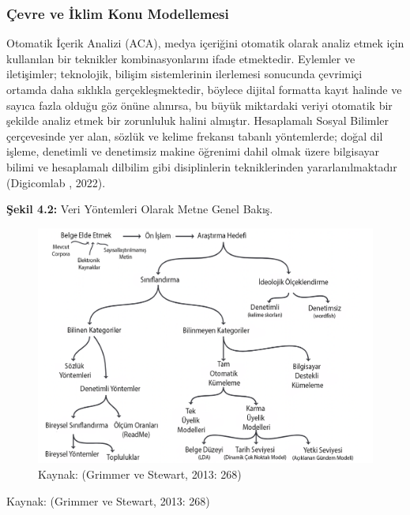\documentclass[
]{book}
\begin{document}
\hypertarget{uxe7evre-ve-iklim-konu-modellemesi}{%
\subsubsection{Çevre ve İklim Konu Modellemesi}\label{uxe7evre-ve-iklim-konu-modellemesi}}

Otomatik İçerik Analizi (ACA), medya içeriğini otomatik olarak analiz etmek için kullanılan bir teknikler kombinasyonlarını ifade etmektedir. Eylemler ve iletişimler; teknolojik, bilişim sistemlerinin ilerlemesi sonucunda çevrimiçi ortamda daha sıklıkla gerçekleşmektedir, böylece dijital formatta kayıt halinde ve sayıca fazla olduğu göz önüne alınırsa, bu büyük miktardaki veriyi otomatik bir şekilde analiz etmek bir zorunluluk halini almıştır. Hesaplamalı Sosyal Bilimler çerçevesinde yer alan, sözlük ve kelime frekansı tabanlı yöntemlerde; doğal dil işleme, denetimli ve denetimsiz makine öğrenimi dahil olmak üzere bilgisayar bilimi ve hesaplamalı dilbilim gibi disiplinlerin tekniklerinden yararlanılmaktadır (Digicomlab , 2022).

\textbf{Şekil 4.2:} Veri Yöntemleri Olarak Metne Genel Bakış.

\begin{figure}
\includegraphics[width=0.95\linewidth,height=0.95\textheight]{tablolar-sekiller/sekil-4-2} \caption{Kaynak: (Grimmer ve Stewart, 2013: 268)}\label{fig:unnamed-chunk-2}
\end{figure}

Kaynak: (Grimmer ve Stewart, 2013: 268)
\end{document}
